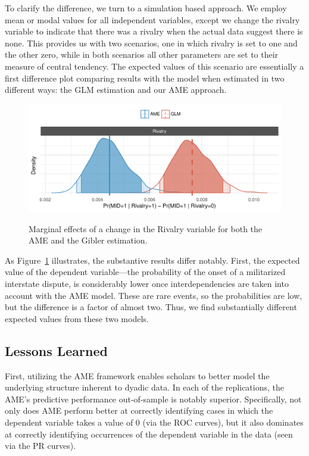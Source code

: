 To clarify the difference, we turn to a simulation based approach. We employ mean or modal values for all independent variables, except we change the rivalry variable to indicate that there was a rivalry when the actual data suggest there is none. This provides us with two scenarios, one in which rivalry is set to one and the other zero, while in both scenarios all other parameters are set to their measure of central tendency. The expected values of this scenario are essentially a first difference plot comparing results with the model when estimated in two different ways: the GLM estimation and our AME approach.  

\begin{figure}
	\caption{Marginal effects of a change in the Rivalry variable for both the AME and the Gibler estimation.  \label{fig:gibmargeff}}
	\includegraphics[width=\textwidth]{graphics/gibler_margeff.pdf}
 	\label{fig:gibmargeff}
 \end{figure}

As Figure~\ref{fig:gibmargeff} illustrates, the substantive results differ notably. First, the expected value of the dependent variable---the probability of the onset of a militarized interstate dispute, is considerably lower once interdependencies are taken into account with the AME model.  These are rare events, so the probabilities are low, but the difference is a factor of almost two. Thus, we find substantially different expected values from these two models.  

\subsection{Lessons Learned}

First, utilizing the AME framework enables scholars to better model the underlying structure inherent to dyadic data. In each of the replications, the AME's predictive performance out-of-sample is notably superior. Specifically, not only does AME perform better at correctly identifying cases in which the dependent variable takes a value of $0$ (via the ROC curves), but it also dominates at correctly identifying occurrences of the dependent variable in the data (seen via the PR curves). 

